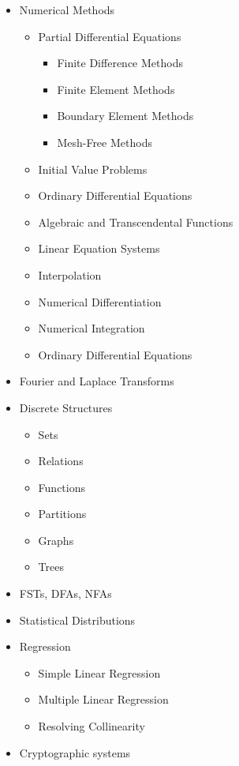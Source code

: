 \documentclass[a4paper]{article}
\begin{document}
\begin{itemize}
\item Numerical Methods
  \begin{itemize}
  \item Partial Differential Equations
    \begin{itemize}
    \item Finite Difference Methods
    \item Finite Element Methods
    \item Boundary Element Methods
    \item Mesh-Free Methods
    \end{itemize}
  \item Initial Value Problems
  \item Ordinary Differential Equations
  \item Algebraic and Transcendental Functions
  \item Linear Equation Systems
  \item Interpolation
  \item Numerical Differentiation
  \item Numerical Integration
  \item Ordinary Differential Equations
  \end{itemize}
\item Fourier and Laplace Transforms
\item Discrete Structures
  \begin{itemize}
  \item Sets
  \item Relations
  \item Functions
  \item Partitions
  \item Graphs
  \item Trees
  \end{itemize}
\item FSTs, DFAs, NFAs
\item Statistical Distributions
\item Regression
  \begin{itemize}
  \item Simple Linear Regression
  \item Multiple Linear Regression
  \item Resolving Collinearity
  \end{itemize}
\item Cryptographic systems
\end{itemize}
\end{document}
